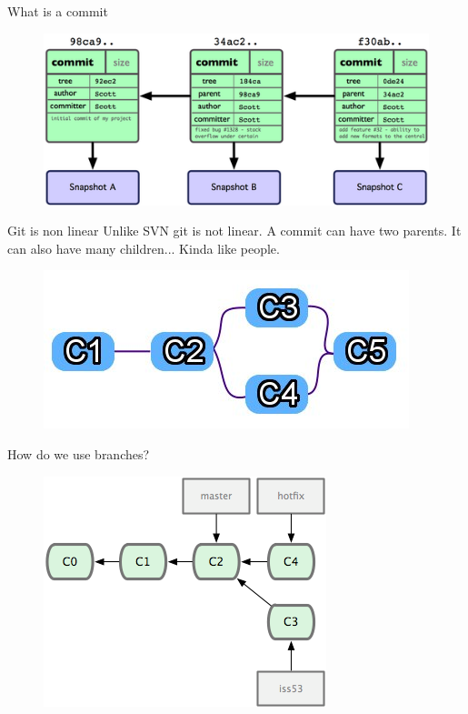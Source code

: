 \documentclass[14pt]{beamer}
\begin{document}
\begin{frame}{What is a commit}
	\begin{figure}[htb]
		\centering
		\includegraphics[width=\textwidth]{commitSnapshots.png}
	\end{figure}
\end{frame}

\begin{frame}{Git is non linear}
	Unlike SVN git is not linear.  A commit can have two parents.  It can also have many children... Kinda like people.
	\begin{figure}[htb]
		\centering
		\includegraphics[width=\textwidth]{nonLinearCommits.jpg}
	\end{figure}
\end{frame}

\begin{frame}{How do we use branches?}
	\begin{figure}[htb]
		\centering
		\includegraphics[width=.7\textwidth]{hotfix.png}
	\end{figure}
\end{frame}
\end{document}
